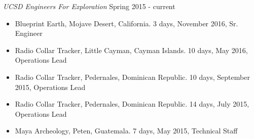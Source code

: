 \documentclass[line,margin]{res}
\begin{document}
\begin{resume}
	{\sl UCSD Engineers For Exploration} \hfill Spring 2015 - current
	\begin{itemize}
		\item Blueprint Earth, Mojave Desert, California. 3 days, November 2016, Sr. Engineer
		\item Radio Collar Tracker, Little Cayman, Cayman Islands. 10 days, May 2016, Operations Lead
		\item Radio Collar Tracker, Pedernales, Dominican Republic. 10 days, September 2015, Operations Lead
		\item Radio Collar Tracker, Pedernales, Dominican Republic. 14 days, July 2015, Operations Lead
		\item Maya Archeology, Peten, Guatemala. 7 days, May 2015, Technical Staff
	\end{itemize}


\end{resume}
\end{document}
